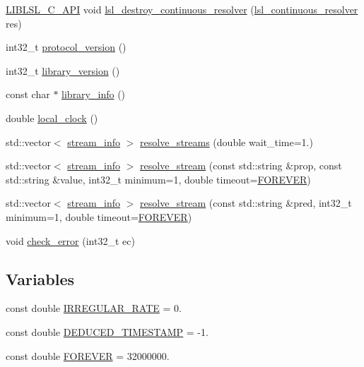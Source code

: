 \begin{DoxyCompactItemize}
\item 
\hyperlink{lsl__cpp_8h_aafd0ef1813e8be84a1420c4f1df64615}{L\+I\+B\+L\+S\+L\+\_\+\+C\+\_\+\+A\+PI} void \hyperlink{namespacelsl_ab93a61a86bf3e5da34f91255897f6b03}{lsl\+\_\+destroy\+\_\+continuous\+\_\+resolver} (\hyperlink{namespacelsl_ab09ea0488f986f056322c3c866dc0a0f}{lsl\+\_\+continuous\+\_\+resolver} res)
\item 
int32\+\_\+t \hyperlink{namespacelsl_a59009e83a8f0e33643474b373ad2f7f2}{protocol\+\_\+version} ()
\item 
int32\+\_\+t \hyperlink{namespacelsl_a25fc4deea3c2fb0df0744e3a24c56844}{library\+\_\+version} ()
\item 
const char $\ast$ \hyperlink{namespacelsl_a2a348cf022e9862396e4a10f60af42e9}{library\+\_\+info} ()
\item 
double \hyperlink{namespacelsl_ae1766ae2ab66141cb927612e57a0c8c6}{local\+\_\+clock} ()
\item 
std\+::vector$<$ \hyperlink{classlsl_1_1stream__info}{stream\+\_\+info} $>$ \hyperlink{namespacelsl_a2935ff3db04cd640f69943ad14a61915}{resolve\+\_\+streams} (double wait\+\_\+time=1.)
\item 
std\+::vector$<$ \hyperlink{classlsl_1_1stream__info}{stream\+\_\+info} $>$ \hyperlink{namespacelsl_a4edfbcc31f48f27e8f7c2a36b69cd4b9}{resolve\+\_\+stream} (const std\+::string \&prop, const std\+::string \&value, int32\+\_\+t minimum=1, double timeout=\hyperlink{namespacelsl_a74cfbc9077aca21295117217249721ed}{F\+O\+R\+E\+V\+ER})
\item 
std\+::vector$<$ \hyperlink{classlsl_1_1stream__info}{stream\+\_\+info} $>$ \hyperlink{namespacelsl_a824e14275a55df97d0552a91fc2c4097}{resolve\+\_\+stream} (const std\+::string \&pred, int32\+\_\+t minimum=1, double timeout=\hyperlink{namespacelsl_a74cfbc9077aca21295117217249721ed}{F\+O\+R\+E\+V\+ER})
\item 
void \hyperlink{namespacelsl_acce0545ac0a7831acde1a759b778393c}{check\+\_\+error} (int32\+\_\+t ec)
\end{DoxyCompactItemize}
\subsection*{Variables}
\begin{DoxyCompactItemize}
\item 
const double \hyperlink{namespacelsl_ac7ebddefe1091ef2d9459b6f9d79f7ab}{I\+R\+R\+E\+G\+U\+L\+A\+R\+\_\+\+R\+A\+TE} = 0.
\item 
const double \hyperlink{namespacelsl_a57df17d8a2563a18b8b759a0cec696cc}{D\+E\+D\+U\+C\+E\+D\+\_\+\+T\+I\+M\+E\+S\+T\+A\+MP} = -\/1.
\item 
const double \hyperlink{namespacelsl_a74cfbc9077aca21295117217249721ed}{F\+O\+R\+E\+V\+ER} = 32000000.
\end{DoxyCompactItemize}


